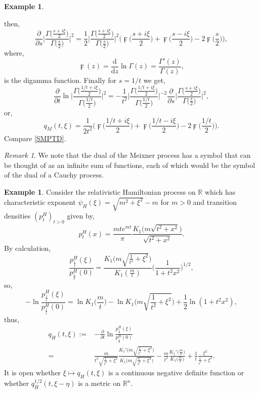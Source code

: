 \documentclass[a4paper, 12pt]{report}
\theoremstyle{remark}
\newtheorem{remark}[theorem]{Remark}
\theoremstyle{definition}
\newtheorem{example}[theorem]{Example}
\begin{document}
\begin{example}
\begin{itemize}
$$$$
then,
$$
\frac{\partial}{\partial s}\bigg|\frac{\Gamma\big(\frac{s + i\xi}{2}\big)}{\Gamma\big(\frac{s}{2}\big)}\bigg|^2 = \frac{1}{2}\bigg|\frac{\Gamma\big(\frac{s + i\xi}{2}\big)}{\Gamma\big(\frac{s}{2}\big)}\bigg|^2\bigg(\digamma\bigg(\frac{s + i\xi}{2}\bigg) + \digamma\bigg(\frac{s - i\xi}{2}\bigg) - 2\digamma\bigg(\frac{s}{2}\bigg)\bigg),
$$
where,
$$
\digamma(z) = \frac{\mathrm{d}}{\mathrm{d}z}\ln\Gamma(z) = \frac{\Gamma'(z)}{\Gamma(z)},
$$
is the digamma function.  Finally for $s = 1/t$ we get,
$$
\frac{\partial}{\partial t}\ln\bigg|\frac{\Gamma\big(\frac{1/t + i\xi}{2}\big)}{\Gamma\big(\frac{1/t}{2}\big)}\bigg|^2 = -\frac{1}{t^2}\bigg|\frac{\Gamma\big(\frac{1/t + i\xi}{2}\big)}{\Gamma\big(\frac{1/t}{2}\big)}\bigg|^{-2}\frac{\partial}{\partial s}\bigg|\frac{\Gamma\big(\frac{s + i\xi}{2}\big)}{\Gamma\big(\frac{s}{2}\big)}\bigg|^2,
$$
or,
$$
q_M(t, \xi) = \frac{1}{2t^2}\Bigg(\digamma\bigg(\frac{1/t + i\xi}{2}\bigg) + \digamma\bigg(\frac{1/t - i\xi}{2}\bigg) - 2\digamma\bigg(\frac{1/t}{2}\bigg)\Bigg).
$$
Compare \eqref{SMPTD}.
\end{itemize}
\end{example}
\begin{remark}
We note that the dual of the Meixner process has a symbol that can be thought of as an infinite sum of functions, each of which would be the symbol of the dual of a Cauchy process.
\end{remark}

\begin{example}
Consider the relativistic Hamiltonian process on $\mathbb{R}$ which has characteristic exponent $\psi_H(\xi) = \sqrt{m^2 + \xi^2} - m$ for $m > 0$ and transition densities $(p_t^H)_{t > 0}$ given by,
$$
p_t^H(x) = \frac{mte^{mt}}{\pi}\frac{K_1\big(m\sqrt{t^2 + x^2}\big)}{\sqrt{t^2 + x^2}}.
$$
By calculation,
$$
\frac{p_\frac{1}{t}^H(\xi)}{p_\frac{1}{t}^H(0)} = \frac{K_1\Big(m\sqrt{\frac{1}{t^2} + \xi^2}\Big)}{K_1(\frac{m}{t})}\bigg(\frac{1}{1 + t^2x^2}\bigg)^{1/2},
$$
so,
$$
-\ln\frac{p_\frac{1}{t}^H(\xi)}{p_\frac{1}{t}^H(0)} = \ln K_1\Big(\frac{m}{t}\Big) - \ln K_1\bigg(m\sqrt{\frac{1}{t^2} + \xi^2}\bigg) + \frac{1}{2}\ln(1 + t^2x^2),
$$
thus,
$$
\begin{aligned}
q_H(t, \xi) := & -\frac{\partial}{\partial t}\ln\frac{p_\frac{1}{t}^H(\xi)}{p_\frac{1}{t}^H(0)}\\
= & \frac{m}{t^3\sqrt{\frac{1}{t^2} + \xi^2}}\frac{K_1'\Big(m\sqrt{\frac{1}{t^2} + \xi^2}\Big)}{K_1\Big(m\sqrt{\frac{1}{t^2} + \xi^2}\Big)} - \frac{m}{t^2}\frac{K_1'\big(\frac{m}{t}\big)}{K_1\big(\frac{m}{t}\big)} + \frac{1}{t}\frac{\xi^2}{\frac{1}{t^2} + \xi^2}.
\end{aligned}
$$
It is open whether $\xi \mapsto q_H(t, \xi)$ is a continuous negative definite function or whether $q_H^{1/2}(t, \xi - \eta)$ is a metric on $\mathbb{R}^n$.
\end{example}
\end{document}
